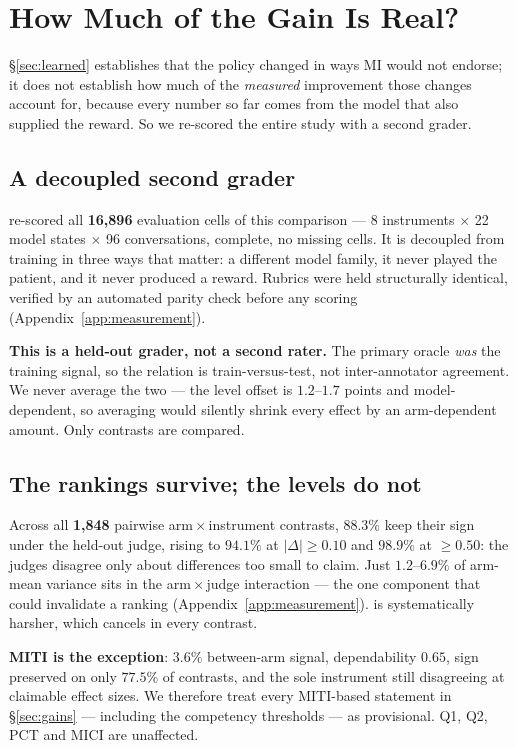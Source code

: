 \section{How Much of the Gain Is Real?}
\label{sec:heldout}

\S\ref{sec:learned} establishes that the policy changed in ways MI would not endorse; it does
not establish how much of the \emph{measured} improvement those changes account for, because
every number so far comes from the model that also supplied the reward. So we re-scored the
entire study with a second grader.

\subsection{A decoupled second grader}
\heldoutjudge{} re-scored all \textbf{16{,}896} evaluation cells of this comparison --- 8
instruments $\times$ 22 model states $\times$ 96 conversations, complete, no missing cells. It is
decoupled from training in three ways that matter: a different model family, it never played the
patient, and it never produced a reward. Rubrics were held structurally identical, verified by
an automated parity check before any scoring (Appendix~\ref{app:measurement}).

\textbf{This is a held-out grader, not a second rater.} The primary oracle \emph{was} the
training signal, so the relation is train-versus-test, not inter-annotator agreement. We never
average the two --- the level offset is $1.2$--$1.7$ points and model-dependent, so averaging
would silently shrink every effect by an arm-dependent amount. Only contrasts are compared.

\subsection{The rankings survive; the levels do not}
Across all \textbf{1{,}848} pairwise arm\,$\times$\,instrument contrasts, $88.3\%$ keep their
sign under the held-out judge, rising to $94.1\%$ at $|\Delta|\geq0.10$ and $98.9\%$ at
$\geq0.50$: the judges disagree only about differences too small to claim. Just $1.2$--$6.9\%$
of arm-mean variance sits in the arm\,$\times$\,judge interaction --- the one component that
could invalidate a ranking (Appendix~\ref{app:measurement}). \heldoutjudge{} is systematically
harsher, which cancels in every contrast.

\textbf{MITI is the exception}: $3.6\%$ between-arm signal, dependability $0.65$, sign preserved
on only $77.5\%$ of contrasts, and the sole instrument still disagreeing at claimable effect
sizes. We therefore treat every MITI-based statement in \S\ref{sec:gains} --- including the
competency thresholds --- as provisional. Q1, Q2, PCT and MICI are unaffected.

